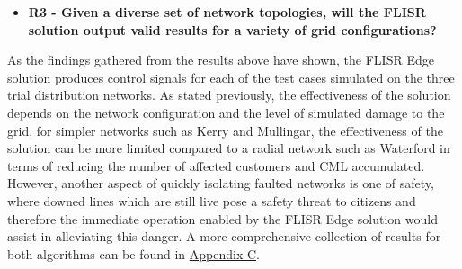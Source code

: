 \begin{itemize}
  \item \textbf{R3 - Given a diverse set of network topologies, will the FLISR solution output valid results for a variety of grid configurations?}
\end{itemize}

\noindent As the findings gathered from the results above have shown, the FLISR Edge solution produces control signals for each of the test cases simulated on the three trial distribution networks. As
stated previously, the effectiveness of the solution depends on the network configuration and the level of simulated damage to the grid, for simpler networks such as Kerry and Mullingar,
the effectiveness of the solution can be more limited compared to a radial network such as Waterford in terms of reducing the number of affected customers and CML accumulated.
However, another aspect of quickly isolating faulted networks is one of safety, where downed lines which are still live pose a safety threat to citizens and therefore the immediate operation
enabled by the FLISR Edge solution would assist in alleviating this danger. A more comprehensive collection of results for both algorithms can be found in \hyperref[sec:appendix_c]{Appendix C}.


